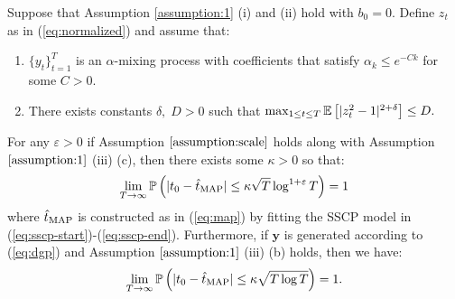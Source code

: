 \begin{theorem}\label{theorem:sscp}
    Suppose that Assumption \ref{assumption:1} (i) and (ii) hold with $b_0=0$. Define $z_t$ as in (\ref{eq:normalized}) and assume that:
    \vspace{-10pt}
    \begin{enumerate}[label=(\roman*)]
        \item $\{y_t\}_{t=1}^T$ is an $\alpha$-mixing process with coefficients that satisfy $\alpha_k \leq e^{-Ck}$ for some $C > 0$.
        \item There exists constants $\delta, \; D > 0$ such that $\max_{1\leq t \leq T} \E\left[|z_t^2 - 1|^{2+\delta}\right]\leq D.$ 
    \end{enumerate}
    \vspace{-5pt}
    For any $\varepsilon > 0$ if Assumption $\ref{assumption:scale}$ holds along with Assumption $\ref{assumption:1}$ (iii) (c), then there exists some $\kappa > 0$ so that: 
    \vspace{-5pt}
    \begin{align*}
        \lim_{T\to\infty}\Pr\left(|t_0 - \hat{t}_{\normalfont \text{MAP}}| \leq \kappa \sqrt{T}\log^{1+\varepsilon} T\right) = 1  
    \end{align*}
    where $\hat{t}_{\normalfont \text{MAP}}$ is constructed as in (\ref{eq:map}) by fitting the SSCP model in (\ref{eq:sscp-start})-(\ref{eq:sscp-end}). Furthermore, if $\mathbf{y}$ is generated according to (\ref{eq:dgp}) and Assumption $\ref{assumption:1}$ (iii) (b) holds, then we have:
    \vspace{-5pt}
    \begin{align*}
        \lim_{T\to\infty}\Pr\left(|t_0 - \hat{t}_{\normalfont \text{MAP}}| \leq \kappa \sqrt{T\log T}\right) = 1.  
    \end{align*}
\end{theorem}


